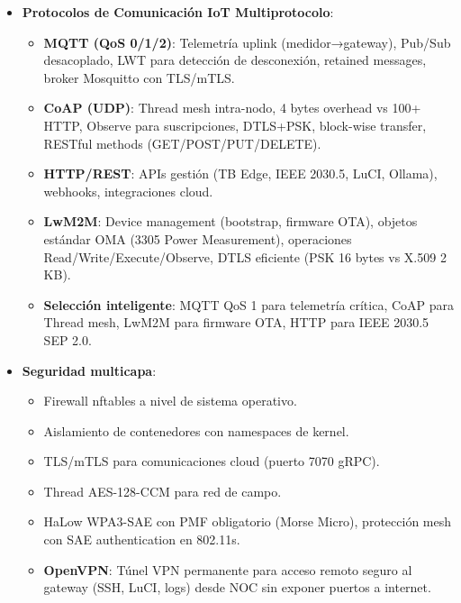 \begin{itemize}
    \item \textbf{Protocolos de Comunicación IoT Multiprotocolo}:
    \begin{itemize}
        \item \textbf{MQTT (QoS 0/1/2)}: Telemetría uplink (medidor→gateway), Pub/Sub desacoplado, LWT para detección de desconexión, retained messages, broker Mosquitto con TLS/mTLS.
        \item \textbf{CoAP (UDP)}: Thread mesh intra-nodo, 4 bytes overhead vs 100+ HTTP, Observe para suscripciones, DTLS+PSK, block-wise transfer, RESTful methods (GET/POST/PUT/DELETE).
        \item \textbf{HTTP/REST}: APIs gestión (TB Edge, IEEE 2030.5, LuCI, Ollama), webhooks, integraciones cloud.
        \item \textbf{LwM2M}: Device management (bootstrap, firmware OTA), objetos estándar OMA (3305 Power Measurement), operaciones Read/Write/Execute/Observe, DTLS eficiente (PSK 16 bytes vs X.509 2 KB).
        \item \textbf{Selección inteligente}: MQTT QoS 1 para telemetría crítica, CoAP para Thread mesh, LwM2M para firmware OTA, HTTP para IEEE 2030.5 SEP 2.0.
    \end{itemize}
    
    \item \textbf{Seguridad multicapa}:
    \begin{itemize}
        \item Firewall nftables a nivel de sistema operativo.
        \item Aislamiento de contenedores con namespaces de kernel.
        \item TLS/mTLS para comunicaciones cloud (puerto 7070 gRPC).
        \item Thread AES-128-CCM para red de campo.
        \item HaLow WPA3-SAE con PMF obligatorio (Morse Micro), protección mesh con SAE authentication en 802.11s.
        \item \textbf{OpenVPN}: Túnel VPN permanente para acceso remoto seguro al gateway (SSH, LuCI, logs) desde NOC sin exponer puertos a internet.
    \end{itemize}
    

\end{itemize}

